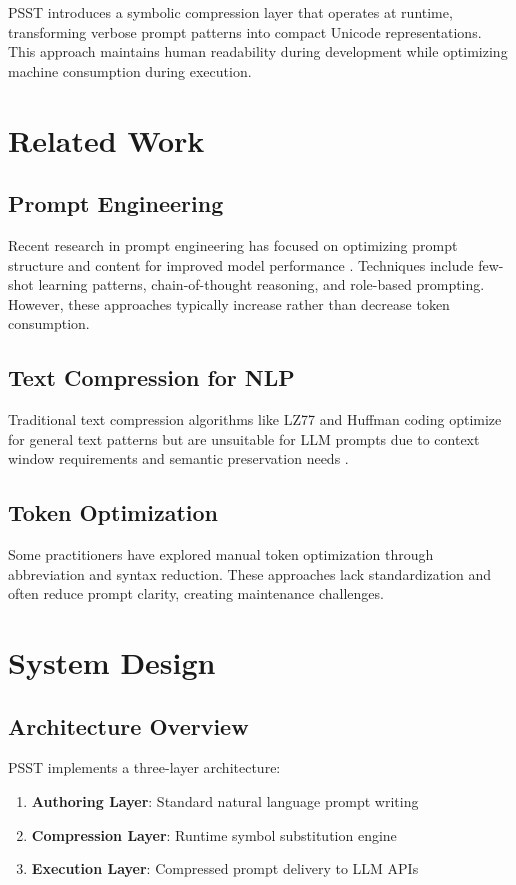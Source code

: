 \documentclass[11pt,twocolumn]{article}
\begin{document}
PSST introduces a symbolic compression layer that operates at runtime, transforming verbose prompt patterns into compact Unicode representations. This approach maintains human readability during development while optimizing machine consumption during execution.

\section{Related Work}

\subsection{Prompt Engineering}
Recent research in prompt engineering has focused on optimizing prompt structure and content for improved model performance \cite{brown2020language}. Techniques include few-shot learning patterns, chain-of-thought reasoning, and role-based prompting. However, these approaches typically increase rather than decrease token consumption.

\subsection{Text Compression for NLP}
Traditional text compression algorithms like LZ77 and Huffman coding optimize for general text patterns but are unsuitable for LLM prompts due to context window requirements and semantic preservation needs \cite{salomon2007data}.

\subsection{Token Optimization}
Some practitioners have explored manual token optimization through abbreviation and syntax reduction. These approaches lack standardization and often reduce prompt clarity, creating maintenance challenges.

\section{System Design}

\subsection{Architecture Overview}

PSST implements a three-layer architecture:

\begin{enumerate}
\item \textbf{Authoring Layer}: Standard natural language prompt writing
\item \textbf{Compression Layer}: Runtime symbol substitution engine
\item \textbf{Execution Layer}: Compressed prompt delivery to LLM APIs
\end{enumerate}
\end{document}
